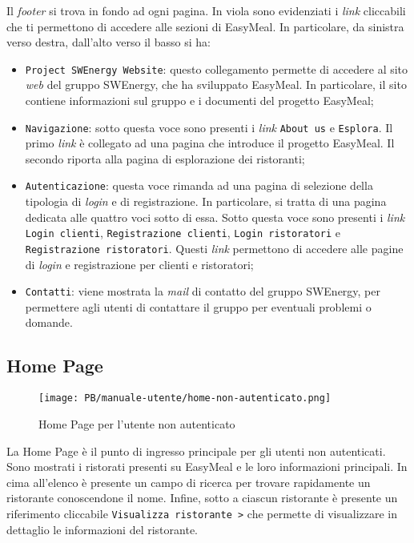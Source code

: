 Il \textit{footer} si trova in fondo ad ogni pagina. In viola sono evidenziati i \textit{link}
cliccabili che ti permettono di accedere alle sezioni di EasyMeal. In
particolare, da sinistra verso destra, dall'alto verso il basso si ha:
\begin{itemize}
	\item \texttt{Project SWEnergy Website}: questo collegamento permette di
		accedere al sito \textit{web} del gruppo SWEnergy, che ha sviluppato EasyMeal.
		In particolare, il sito contiene informazioni sul gruppo e i documenti
		del progetto EasyMeal;

	\item \texttt{Navigazione}: sotto questa voce sono presenti i \textit{link} \texttt{About
		us} e \texttt{Esplora}. Il primo \textit{link} è collegato ad una pagina che introduce
		il progetto EasyMeal. Il secondo riporta alla pagina di esplorazione dei
		ristoranti;

	\item \texttt{Autenticazione}: questa voce rimanda ad una pagina di
		selezione della tipologia di \textit{login} e di registrazione. In particolare,
		si tratta di una pagina dedicata alle quattro voci sotto di essa. Sotto
		questa voce sono presenti i \textit{link} \texttt{Login clienti}, 
		\texttt{Registrazione clienti}, \texttt{Login ristoratori} e 
		\texttt{Registrazione ristoratori}. Questi
		\textit{link} permettono di accedere alle pagine di \textit{login} e registrazione per clienti e ristoratori;

	\item \texttt{Contatti}: viene mostrata la \textit{mail} di contatto del gruppo
		SWEnergy, per permettere agli utenti di contattare il gruppo per
		eventuali problemi o domande.
\end{itemize}


\subsection{Home Page}

\begin{figure}[htbp]
    \centering
	\texttt{[image: PB/manuale-utente/home-non-autenticato.png]}
    \caption{Home Page per l'utente non autenticato}
\end{figure}

La Home Page è il punto di ingresso principale per gli utenti non autenticati. 
Sono mostrati i ristorati presenti su EasyMeal e le loro informazioni
principali. In cima all'elenco è presente un campo di ricerca per trovare
rapidamente un ristorante conoscendone il nome. Infine, sotto a ciascun
ristorante è presente un riferimento cliccabile \texttt{Visualizza ristorante >}
che permette di visualizzare in dettaglio le informazioni del ristorante.

